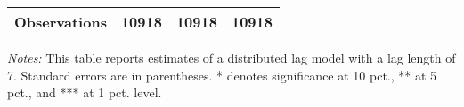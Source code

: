 \begin{table}[h]
{\begin{threeparttable}
\begin{tabular}{l*{3}{c}}
Observations    &    10918         &    10918         &    10918         \\
\bottomrule \end{tabular} \begin{tablenotes}[flushleft] \footnotesize \item \emph{Notes:} This table reports estimates of a distributed lag model with a lag length of 7. Standard errors are in parentheses. * denotes significance at 10 pct., ** at 5 pct., and *** at 1 pct. level. \end{tablenotes} \end{threeparttable} } \end{table}

